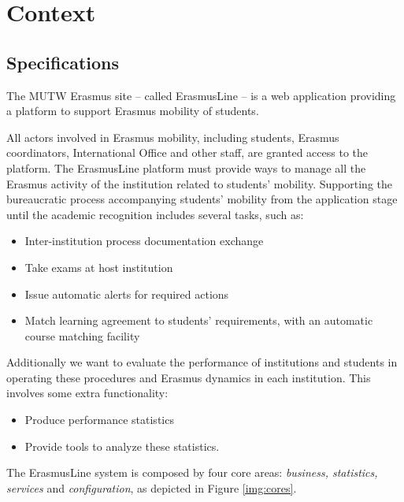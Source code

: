 \chapter{Context} \label{ch:context}

\section{Specifications} \label{sec:specs}

The MUTW Erasmus site – called ErasmusLine – is a web application
providing a platform to support Erasmus mobility of students.

All actors involved in Erasmus mobility, including students, Erasmus
coordinators, International Office and other staff, are granted access to the
platform. The ErasmusLine platform must provide ways to manage all the Erasmus
activity of the institution related to students’ mobility. Supporting the
bureaucratic process accompanying students’ mobility from the application stage
until the academic recognition includes several tasks, such as:

\begin{itemize}
  \item Inter-institution process documentation exchange
  \item Take exams at host institution
  \item Issue automatic alerts for required actions
  \item Match learning agreement to students’ requirements, with an automatic
  course matching facility
\end{itemize}

Additionally we want to evaluate the performance of institutions and students in
operating these procedures and Erasmus dynamics in each institution. This
involves some extra functionality:

\begin{itemize}
  \item Produce performance statistics
  \item Provide tools to analyze these statistics.
\end{itemize}

The ErasmusLine system is composed by four core areas: \emph{business,
statistics, services} and \emph{configuration}, as depicted in Figure
\ref{img:cores}. \newline


